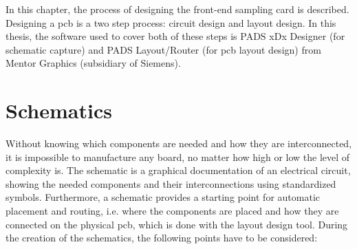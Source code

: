 In this chapter, the process of designing the front-end sampling card is described.
Designing a \gls{pcb} is a two step process: circuit design and layout design.
In this thesis, the software used to cover both of these steps is PADS xDx Designer (for schematic capture) and PADS Layout/Router (for \gls{pcb} layout design) from Mentor Graphics (subsidiary of Siemens).

\section{Schematics}
Without knowing which components are needed and how they are interconnected, it is impossible to manufacture any board, no matter how high or low the level of complexity is.
The schematic is a graphical documentation of an electrical circuit, showing the needed components and their interconnections using standardized symbols. 
Furthermore, a schematic provides a starting point for automatic placement and routing, i.e. where the components are placed and how they are connected on the physical \gls{pcb}, which is done with the layout design tool.
During the creation of the schematics, the following points have to be considered:

